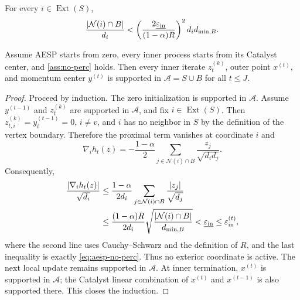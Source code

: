 \begin{assumption}
\label{ass:no-perc}
For every $i\in\operatorname{Ext}(S)$,
\begin{equation}
  \frac{\left\lvert \mathcal N(i)\cap B \right\rvert}{d_i}
  <
  \left(\frac{2\underline{\varepsilon_{\mathrm{in}}}}{(1-\alpha)R}\right)^2
  d_i d_{\min,B}.
  \label{eq:aesp-no-perc}
\end{equation}
\end{assumption}

\begin{lemma}
\label{lem:aesp-confinement}
Assume AESP starts from zero, every inner process starts from its Catalyst
center, and \cref{ass:no-perc} holds.  Then every inner iterate
$z_t^{(k)}$, outer point $x^{(t)}$, and momentum center $y^{(t)}$ is supported
in $\mathcal A=S\cup B$ for all $t\leq J$.
\end{lemma}

\begin{proof}
Proceed by induction.  The zero initialization is supported in $\mathcal A$.
Assume $y^{(t-1)}$ and $z_t^{(k)}$ are supported in $\mathcal A$, and fix
$i\in\operatorname{Ext}(S)$.  Then
$z_{t,i}^{(k)}=y_i^{(t-1)}=0$, $i\neq v$, and $i$ has no neighbor in $S$ by
the definition of the vertex boundary.  Therefore the proximal term vanishes
at coordinate $i$ and
\begin{equation}
  \nabla_i h_t(z)
  =-\frac{1-\alpha}{2}
    \sum_{j\in\mathcal N(i)\cap B}\frac{z_j}{\sqrt{d_i d_j}}.
  \label{eq:exterior-gradient}
\end{equation}
Consequently,
\begin{align}
  \frac{\left\lvert \nabla_i h_t(z) \right\rvert}{\sqrt{d_i}}
  &\leq
  \frac{1-\alpha}{2d_i}
  \sum_{j\in\mathcal N(i)\cap B}\frac{\left\lvert z_j \right\rvert}{\sqrt{d_j}}
  \nonumber\\
  &\leq
  \frac{(1-\alpha)R}{2d_i}
  \sqrt{\frac{\left\lvert \mathcal N(i)\cap B \right\rvert}{d_{\min,B}}}
  <\underline{\varepsilon_{\mathrm{in}}}\leq\varepsilon_{\mathrm{in}}^{(t)},
  \label{eq:exterior-inactive}
\end{align}
where the second line uses Cauchy--Schwarz and the definition of $R$, and the
last inequality is exactly \cref{eq:aesp-no-perc}.  Thus no exterior coordinate
is active.  The next local update remains supported in $\mathcal A$.
At inner termination, $x^{(t)}$ is supported in $\mathcal A$; the Catalyst
linear combination of $x^{(t)}$ and $x^{(t-1)}$ is also supported there.
This closes the induction.
\end{proof}

